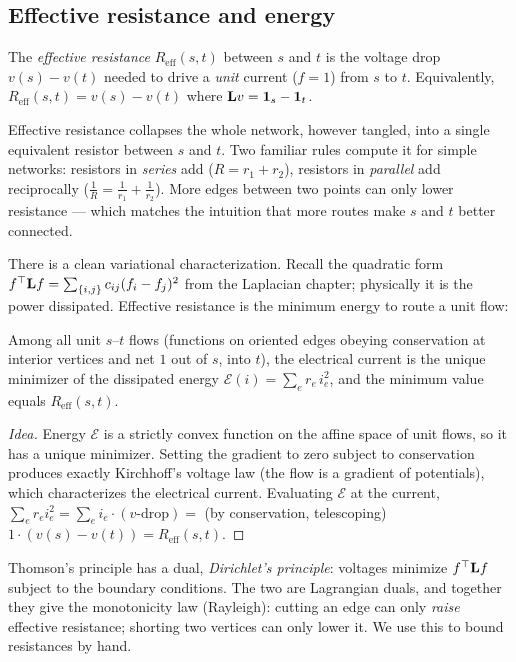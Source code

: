 \subsection{Effective resistance and energy}

\begin{definition}\label{ch35:def-reff}
The \emph{effective resistance} $R_{\mathrm{eff}}(s,t)$ between $s$ and $t$ is the voltage drop $v(s)-v(t)$ needed to drive a \emph{unit} current ($f=1$) from $s$ to $t$. Equivalently, $R_{\mathrm{eff}}(s,t)=v(s)-v(t)$ where $\mathbf{L} v=\mathbf{1}_s-\mathbf{1}_t$.
\end{definition}

Effective resistance collapses the whole network, however tangled, into a single equivalent resistor between $s$ and $t$. Two familiar rules compute it for simple networks: resistors in \emph{series} add ($R=r_1+r_2$), resistors in \emph{parallel} add reciprocally ($\frac1R=\frac1{r_1}+\frac1{r_2}$). More edges between two points can only lower resistance --- which matches the intuition that more routes make $s$ and $t$ better connected.

There is a clean variational characterization. Recall the quadratic form $f^\top\mathbf{L} f=\sum_{\{i,j\}}c_{ij}(f_i-f_j)^2$ from the Laplacian chapter; physically it is the power dissipated. Effective resistance is the minimum energy to route a unit flow:

\begin{theorem}\label{ch35:thm-thomson}
Among all unit $s$--$t$ flows (functions on oriented edges obeying conservation at interior vertices and net $1$ out of $s$, into $t$), the electrical current is the unique minimizer of the dissipated energy $\mathcal{E}(i)=\sum_{e}r_e\,i_e^2$, and the minimum value equals $R_{\mathrm{eff}}(s,t)$.
\end{theorem}

\begin{proof}[Idea]
Energy $\mathcal{E}$ is a strictly convex function on the affine space of unit flows, so it has a unique minimizer. Setting the gradient to zero subject to conservation produces exactly Kirchhoff's voltage law (the flow is a gradient of potentials), which characterizes the electrical current. Evaluating $\mathcal{E}$ at the current, $\sum_e r_e i_e^2=\sum_e i_e\cdot(\text{$v$-drop})=$ (by conservation, telescoping) $1\cdot(v(s)-v(t))=R_{\mathrm{eff}}(s,t)$.
\end{proof}

Thomson's principle has a dual, \emph{Dirichlet's principle}: voltages minimize $f^\top\mathbf{L} f$ subject to the boundary conditions. The two are Lagrangian duals, and together they give the monotonicity law (Rayleigh): cutting an edge can only \emph{raise} effective resistance; shorting two vertices can only lower it. We use this to bound resistances by hand.

